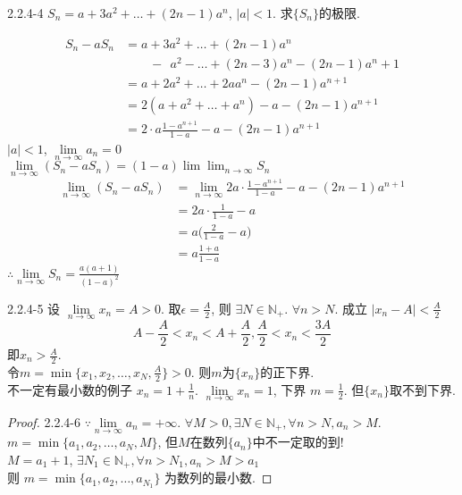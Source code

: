 \begin{qs}
	2.2.4-4
	$ S_n = a+3a^2+\dots+(2n-1)a^n $, $ |a|<1 $. 求$ \{S_n\} $的极限.
\end{qs}
\begin{solve*}
	\begin{align*}
		S_n-aS_n
		&=a+3a^2+\dots+(2n-1)a^n\\
		&\qquad-\;\,a^2-\dots+(2n-3)a^n-(2n-1)a^n+1\\
		&=a+2a^2+\dots+2aa^n-(2n-1)a^{n+1}\\
		&=2(a+a^2+\dots+a^n)-a-(2n-1)a^{n+1}\\
		&=2\cdot{a}\frac{1-a^{n+1}}{1-a}-a-(2n-1)a^{n+1}
	\end{align*}
	$ |a|<1 $, $ \lim\limits_{n\rightarrow\infty}a_n=0 $\\
	$ \lim\limits_{n\rightarrow\infty}(S_n-aS_n) = (1-a)\lim\lim_{n\rightarrow\infty}S_n $
	\begin{align*}
		\lim_{n\rightarrow\infty}(S_n-aS_n)
		&=\lim_{n\rightarrow\infty}
		2a\cdot\frac{1-a^{n+1}}{1-a}-a-(2n-1)a^{n+1}\\
		&=2a\cdot\frac{1}{1-a}-a\\
		&=a\Big(\frac{2}{1-a}-a\Big)\\
		&=a\frac{1+a}{1-a}
	\end{align*}
$ \therefore \lim\limits_{n\rightarrow\infty} S_n = \frac{a(a+1)}{(1-a)^2} $
\end{solve*}

\begin{solve*}
	2.2.4-5
	设 $ \lim\limits_{n\rightarrow\infty} x_n = A>0 $. 取$ \epsilon = \frac{A}{2} $, 则 $ \exists N\in\mathbb{N}_+ $. $ \forall n>N $. 成立 $ |x_n-A|<\frac{A}{2} $ 
	\begin{equation*}
		A-\frac{A}{2}<x_n<A+\frac{A}{2}, \frac{A}{2}<x_n<\frac{3A}{2}
	\end{equation*}
	即$ x_n>\frac{A}{2} $.\\
	令$ m = \min\{x_1,x_2,\dots,x_N,\frac{A}{2}\} >0 $. 则$ m $为$ \{x_n\} $的正下界.\\
	不一定有最小数的例子 $ x_n = 1+\frac{1}{n} $. $ \lim\limits_{n\rightarrow\infty}x_n = 1 $, 下界 $ m=  \frac{1}{2} $. 但$ \{x_n\} $取不到下界.
\end{solve*}

\begin{proof}
	2.2.4-6
	$ \because\lim\limits_{n\rightarrow\infty} a_n = +\infty $. $ \forall M>0, \exists N\in\mathbb{N}_+, \forall n>N, a_n>M $.\\
	$ m = \min\{a_1,a_2,\dots,a_N,M\} $, 但$ M $在数列$ \{a_n\} $中不一定取的到!\\
	$ M=a_1+1 $, $ \exists N_1\in\mathbb{N}_+, \forall n>N_1, a_n>M>a_1 $\\
	则 $ m = \min\{a_1,a_2,\dots,a_{N_1}\} $ 为数列的最小数.	
\end{proof}

